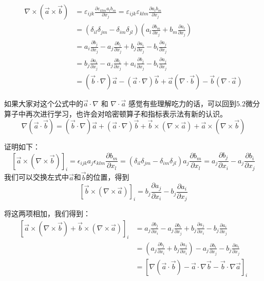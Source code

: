 \documentclass{ctexart}
\begin{document}
$$
\begin{aligned}
\nabla \times(\vec{a} \times \vec{b}) 
&=\varepsilon_{i j k} \frac{\partial \varepsilon_{k l m}a_{l} b_{m} }{ \partial x_{j}}
=\varepsilon_{i j k} \varepsilon_{k l m} \frac{\partial a_{l} b_{m}}{ \partial x_{j}}
\\
&=(\delta_{i l} \delta_{j m} - \delta_{i m} \delta_{j l})(a_{l} \frac{ \partial b_{m} }{\partial x_{j}} + b_{m} \frac{ \partial a_{l} }{\partial x_{j}} )
\\
&=a_{i} \frac{\partial b_{j} }{\partial x_{j} } - a_{j} \frac{\partial b_{i} }{\partial x_{j} } + b_{j} \frac{\partial a_{i} }{\partial x_{j} } - b_{i} \frac{\partial a_{j} }{\partial x_{j} } 
\\
&=b_{j} \frac{\partial a_{i} }{\partial x_{j} } - a_{j} \frac{\partial b_{i} }{\partial x_{j} } + a_{i} \frac{\partial b_{j} }{\partial x_{j} } - b_{i} \frac{\partial a_{j} }{\partial x_{j} } 
\\
&=(\vec{b} \cdot \nabla) \vec{a} - (\vec{a} \cdot \nabla) \vec{b} + \vec{a} (\nabla \cdot \vec{b}) - \vec{b} (\nabla \cdot \vec{a}) 
\end{aligned}
$$
\par
如果大家对这个公式中的$\vec{a} \cdot \nabla$ 和  $ \nabla \cdot \vec{a} $ 感觉有些理解吃力的话，可以回到$5.2$微分算子中再次进行学习，也许会对哈密顿算子和指标表示法有新的认识。
$$
\nabla(\vec{a} \cdot \vec{b})=(\vec{b} \cdot \nabla) \vec{a} + (\vec{a} \cdot \nabla) \vec{b} + \vec{b} \times (\nabla \times \vec{a}) + \vec{a} \times(\nabla \times \vec{b})
$$
\par
证明如下：
$$
[\vec{a} \times (\nabla \times \vec{b})]_{i} 
=\epsilon_{i j k} a_{j} \epsilon_{k l m} \frac{\partial b_{ {m}} }{\partial x_{l}}
=\left(\delta_{i l} \delta_{j m}-\delta_{i m} \delta_{j l}\right) a_{j} \frac{\partial b_{m}}{\partial x_{l}} 
=a_{j} \frac{\partial b_{j}}{\partial x_{i}}-a_{j} \frac{\partial b_{i}}{\partial x_{j}}
$$
我们可以交换左式中$\vec{a}$和$\vec{b}$的位置，得到
$$
[\vec{b} \times (\nabla \times \vec{a})]_{i} =b_{j} \frac{\partial a_{j}}{\partial x_{i}}-b_{j} \frac{\partial a_{i}}{\partial x_{j}}
$$
\par
将这两项相加，我们得到：
$$
\begin{aligned}
  [\vec{a} \times (\nabla \times \vec{b}) + \vec{b} \times (\nabla \times \vec{a})]_{i} &= a_{j} \frac{\partial b_{j}}{\partial x_{i}}-a_{j} \frac{\partial b_{i}}{\partial x_{j}} + b_{j} \frac{\partial a_{j}}{\partial x_{i}}-b_{j} \frac{\partial a_{i}}{\partial x_{j}} \\
  &= (a_{j} \frac{\partial b_{j}}{\partial x_{i}} + b_{j} \frac{\partial a_{j}}{\partial x_{i}}) -a_{j} \frac{\partial b_{i}}{\partial x_{j}} - b_{j} \frac{\partial a_{i}}{\partial x_{j}} \\
  &= [\nabla (\vec{a} \cdot \vec{b}) - \vec{a} \cdot \nabla \vec{b} - \vec{b} \cdot \nabla \vec{a}]_{i}
\end{aligned}
$$
\end{document}
